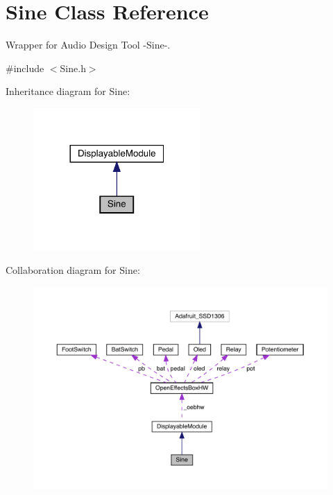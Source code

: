 \hypertarget{class_sine}{}\section{Sine Class Reference}
\label{class_sine}


Wrapper for Audio Design Tool -\/\+Sine-\/.  




{\ttfamily \#include $<$Sine.\+h$>$}



Inheritance diagram for Sine\+:
\nopagebreak
\begin{figure}[H]
\begin{center}
\leavevmode
\includegraphics[width=180pt]{class_sine__inherit__graph}
\end{center}
\end{figure}


Collaboration diagram for Sine\+:
\nopagebreak
\begin{figure}[H]
\begin{center}
\leavevmode
\includegraphics[width=350pt]{class_sine__coll__graph}
\end{center}
\end{figure}
